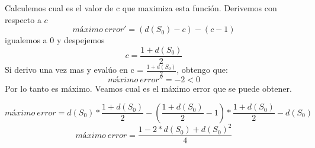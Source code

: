 Calculemos cual es el valor de c que maximiza esta función. Derivemos con respecto a $c$
\begin{equation}
  máximo\ error' = (d(S_{0}) - c) - (c - 1)
\end{equation} 
igualemos a 0 y despejemos
\begin{equation}
  c = \frac{1 + d(S_{0})}{2}
\end{equation} 
Si derivo una vez mas y evalúo en c = $\frac{1 + d(S_{0})}{2}$, obtengo que:
\begin{equation}
  máximo\ error'' = -2 < 0
\end{equation}
Por lo tanto es máximo.\newline \newline
Veamos cual es el máximo error que se puede obtener.

\begin{equation}
  máximo\ error = d(S_{0}) * \frac{1 + d(S_{0})}{2} - (\frac{1 + d(S_{0})}{2} - 1) * \frac{1 + d(S_{0})}{2} - d(S_{0}) 
\end{equation} 
\begin{equation}
  máximo\ error = \frac{1 - 2 * d(S_{0}) + d(S_{0})^{2}}{4} 
\end{equation}


